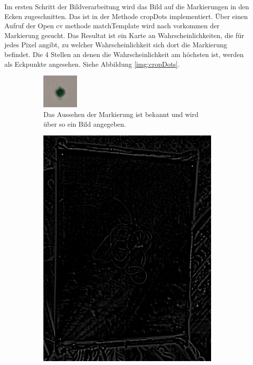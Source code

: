 \documentclass[german,a4paper,12pt]{llncs}
\begin{document}
Im ersten Schritt der Bildverarbeitung wird das Bild auf die Markierungen in den Ecken zugeschnitten. Das ist in der Methode cropDots implementiert.
Über einen Aufruf der Open cv methode matchTemplate wird nach vorkommen der Markierung gesucht. Das Resultat ist ein Karte an Wahrscheinlichkeiten, die für jedes Pixel angibt, zu welcher Wahrscheinlichkeit sich dort die Markierung befindet. Die 4 Stellen an denen die Wahrscheinlichkeit am höchsten ist, werden als Eckpunkte angesehen. Siehe Abbildung \ref{img:cropDots}.
\begin{figure}
	\centering
	\begin{subfigure}[b]{0.475\textwidth}
		\centering
		\includegraphics[width=0.2\textwidth]{fig64/TemplateDot.jpg}
		\caption[]{Das Aussehen der Markierung ist bekannt und wird über so ein Bild angegeben.}
		\label{img:TemplateDot} 
	\end{subfigure}
	\hfill
	\begin{subfigure}[b]{0.475\textwidth} 
		\centering
		\includegraphics[width=\textwidth]{fig64/01match res.png}

\end{subfigure}
\end{figure}
\end{document}
